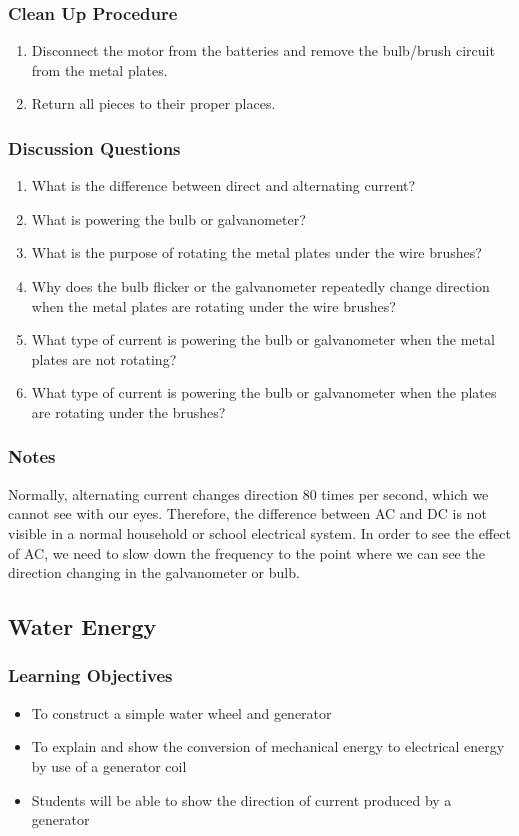\subsubsection*{Clean Up Procedure}
\begin{enumerate}
\item{Disconnect the motor from the batteries and remove the bulb/brush circuit from the metal plates.} 
\item{Return all pieces to their proper places.} 
\end{enumerate}

\subsubsection*{Discussion Questions}
\begin{enumerate}
\item{What is the difference between direct and alternating current?}
\item{What is powering the bulb or galvanometer?}
\item{What is the purpose of rotating the metal plates under the wire brushes?}
\item{Why does the bulb flicker or the galvanometer repeatedly change direction when the metal plates are rotating under the wire brushes?}
\item{What type of current is powering the bulb or galvanometer when the metal plates are not rotating?}
\item{What type of current is powering the bulb or galvanometer when the plates are rotating under the brushes?}
\end{enumerate}

\subsubsection*{Notes}
Normally, alternating current changes direction 80 times per second, which we cannot see with our eyes. Therefore, the difference between AC and DC is not visible in a normal household or school electrical system. In order to see the effect of AC, we need to slow down the frequency to the point where we can see the direction changing in the galvanometer or bulb.


\subsection{Water Energy}

\subsubsection*{Learning Objectives}
\begin{itemize}
\item{To construct a simple water wheel and generator} 
\item{To explain and show the conversion of mechanical energy to electrical energy by use of a generator coil}
\item{Students will be able to show the direction of current produced by a generator}
\end{itemize}

